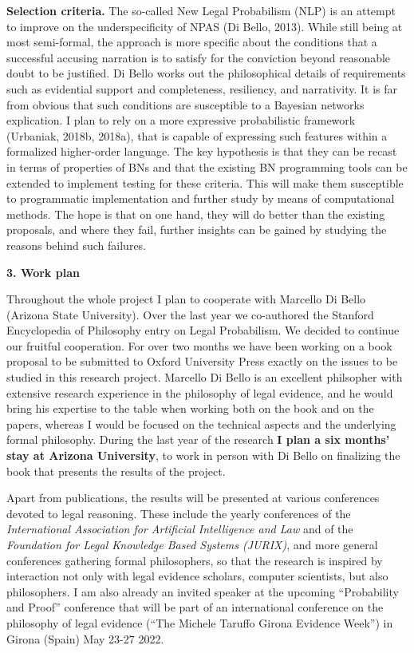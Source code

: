 \documentclass[11pt,dvipsnames,enabledeprecatedfontcommands]{scrartcl}
\begin{document}
\noindent
 \textbf{Selection criteria.} The so-called New Legal Probabilism (NLP)
is an attempt to improve on the underspecificity of NPAS (Di Bello,
2013). While still being at most semi-formal, the approach is more
specific about the conditions that a successful accusing narration is to
satisfy for the conviction beyond reasonable doubt to be justified. Di
Bello works out the philosophical details of requirements such as
evidential support and completeness, resiliency, and narrativity. It is
far from obvious that such conditions are susceptible to a Bayesian
networks explication. I plan to rely on a more expressive probabilistic
framework (Urbaniak, 2018b, 2018a), that is capable of expressing such
features within a formalized higher-order language. The key hypothesis
is that they can be recast in terms of properties of BNs and that the
existing BN programming tools can be extended to implement testing for
these criteria. This will make them susceptible to programmatic
implementation and further study by means of computational methods. The
hope is that on one hand, they will do better than the existing
proposals, and where they fail, further insights can be gained by
studying the reasons behind such failures.

\vspace{1mm}

\noindent \Large \textbf{3. Work plan}

\vspace{1mm} \normalsize

Throughout the whole project I plan to cooperate with Marcello Di Bello
(Arizona State University). Over the last year we co-authored the
Stanford Encyclopedia of Philosophy entry on Legal Probabilism. We
decided to continue our fruitful cooperation. For over two months we
have been working on a book proposal to be submitted to Oxford
University Press exactly on the issues to be studied in this research
project. Marcello Di Bello is an excellent philsopher with extensive
research experience in the philosophy of legal evidence, and he would
bring his expertise to the table when working both on the book and on
the papers, whereas I would be focused on the technical aspects and the
underlying formal philosophy. During the last year of the research
\textbf{I plan a six months' stay at Arizona University}, to work in
person with Di Bello on finalizing the book that presents the results of
the project.

Apart from publications, the results will be presented at various
conferences devoted to legal reasoning. These include the yearly
conferences of the
\emph{International Association for Artificial Intelligence and Law} and
of the \emph{Foundation for Legal Knowledge Based Systems (JURIX)}, and
more general conferences gathering formal philosophers, so that the
research is inspired by interaction not only with legal evidence
scholars, computer scientists, but also philosophers. I am also already
an invited speaker at the upcoming ``Probability and Proof'' conference
that will be part of an international conference on the philosophy of
legal evidence (``The Michele Taruffo Girona Evidence Week'') in Girona
(Spain) May 23-27 2022.
\end{document}
